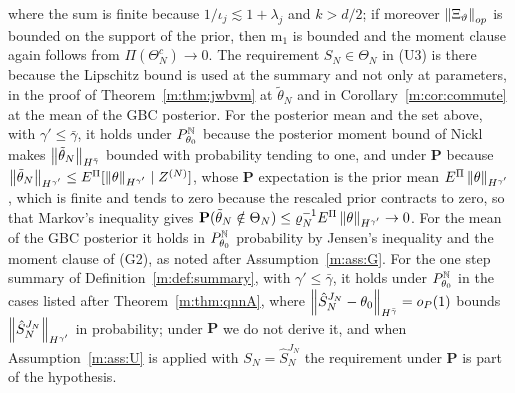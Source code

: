 where the sum is finite because $1/\iota_j\lesssim1+\lambda_j$ and $k>d/2$; if moreover $\left\|\Xi_\vartheta\right\|_{op}$ is bounded on the support of the prior, then $\mathrm m_1$ is bounded and the moment clause again follows from $\Pi(\Theta_N^c)\to0$. The requirement $S_N\in\Theta_N$ in (U3) is there because the Lipschitz bound is used at the summary and not only at parameters, in the proof of Theorem~\ref{m:thm:jwbvm} at $\tilde\theta_N$ and in Corollary~\ref{m:cor:commute} at the mean of the GBC posterior. For the posterior mean and the set above, with $\gamma'\le\bar\gamma$, it holds under $P^{\mathbb{N}}_{\theta_0}$ because the posterior moment bound of Nickl~\cite[equation (39)]{nicklbvm2024} makes $\left\|\tilde\theta_N\right\|_{H^{\bar\gamma}}$ bounded with probability tending to one, and under $\mathbf{P}$ because $\left\|\tilde\theta_N\right\|_{H^{\gamma'}}\le E^\Pi[\left\|\theta\right\|_{H^{\gamma'}}\mid Z^{(N)}]$, whose $\mathbf{P}$ expectation is the prior mean $E^\Pi\left\|\theta\right\|_{H^{\gamma'}}$, which is finite and tends to zero because the rescaled prior contracts to zero, so that Markov's inequality gives $\mathbf{P}(\tilde\theta_N\notin\Theta_N)\le\varrho_N^{-1}E^\Pi\left\|\theta\right\|_{H^{\gamma'}}\to0$. For the mean of the GBC posterior it holds in $P^{\mathbb{N}}_{\theta_0}$ probability by Jensen's inequality and the moment clause of (G2), as noted after Assumption~\ref{m:ass:G}. For the one step summary of Definition~\ref{m:def:summary}, with $\gamma'\le\bar\gamma$, it holds under $P^{\mathbb{N}}_{\theta_0}$ in the cases listed after Theorem~\ref{m:thm:qnnA}, where $\left\|\hat S^{J_N}_N-\theta_0\right\|_{H^{\bar\gamma}}=o_P(1)$ bounds $\left\|\hat S^{J_N}_N\right\|_{H^{\gamma'}}$ in probability; under $\mathbf{P}$ we do not derive it, and when Assumption~\ref{m:ass:U} is applied with $S_N=\hat S^{J_N}_N$ the requirement under $\mathbf{P}$ is part of the hypothesis.

